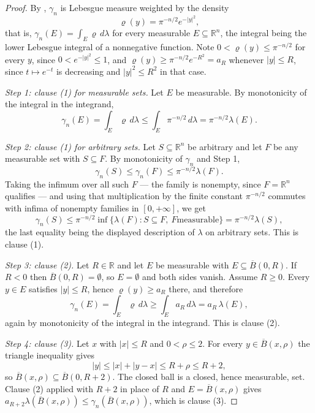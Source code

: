 \begin{proof}
By , $\gamma_n$ is Lebesgue measure weighted by the
density
\[
  \varrho(y) = \pi^{-n/2}e^{-|y|^2} ,
\]
that is, $\gamma_n(E) = \int_E\varrho\,d\lambda$ for every measurable
$E \subseteq \mathbb{R}^n$, the integral being the lower Lebesgue integral of a
nonnegative function.  Note $0 < \varrho(y) \leq \pi^{-n/2}$ for every $y$,
since $0 < e^{-|y|^2} \leq 1$, and $\varrho(y) \geq \pi^{-n/2}e^{-R^2} = a_R$
whenever $|y| \leq R$, since $t \mapsto e^{-t}$ is decreasing and
$|y|^2 \leq R^2$ in that case.

\emph{Step 1: clause (1) for measurable sets.}
Let $E$ be measurable.  By monotonicity of the integral in the integrand,
\[
  \gamma_n(E) = \int_E\varrho\,d\lambda
    \leq \int_E\pi^{-n/2}\,d\lambda
    = \pi^{-n/2}\lambda(E) .
\]

\emph{Step 2: clause (1) for arbitrary sets.}
Let $S \subseteq \mathbb{R}^n$ be arbitrary and let $F$ be any measurable set
with $S \subseteq F$.  By monotonicity of $\gamma_n$ and Step 1,
\[
  \gamma_n(S) \leq \gamma_n(F) \leq \pi^{-n/2}\lambda(F) .
\]
Taking the infimum over all such $F$ --- the family is nonempty, since
$F = \mathbb{R}^n$ qualifies --- and using that multiplication by the finite
constant $\pi^{-n/2}$ commutes with infima of nonempty families in
$[0,+\infty]$, we get
\[
  \gamma_n(S) \leq \pi^{-n/2}\inf\{\lambda(F) : S \subseteq F,\ F \text{
  measurable}\} = \pi^{-n/2}\lambda(S) ,
\]
the last equality being the displayed description of $\lambda$ on arbitrary
sets.  This is clause (1).

\emph{Step 3: clause (2).}
Let $R \in \mathbb{R}$ and let $E$ be measurable with
$E \subseteq \overline B(0,R)$.  If $R < 0$ then $\overline B(0,R) = \emptyset$,
so $E = \emptyset$ and both sides vanish.  Assume $R \geq 0$.  Every $y \in E$
satisfies $|y| \leq R$, hence $\varrho(y) \geq a_R$ there, and therefore
\[
  \gamma_n(E) = \int_E\varrho\,d\lambda
    \geq \int_E a_R\,d\lambda
    = a_R\,\lambda(E) ,
\]
again by monotonicity of the integral in the integrand.  This is clause (2).

\emph{Step 4: clause (3).}
Let $x$ with $|x| \leq R$ and $0 < \rho \leq 2$.  For every
$y \in \overline B(x,\rho)$ the triangle inequality gives
\[
  |y| \leq |x| + |y - x| \leq R + \rho \leq R + 2 ,
\]
so $\overline B(x,\rho) \subseteq \overline B(0,R+2)$.  The closed ball is a
closed, hence measurable, set.  Clause (2) applied with $R+2$ in place of $R$
and $E = \overline B(x,\rho)$ gives
$a_{R+2}\lambda(\overline B(x,\rho)) \leq \gamma_n(\overline B(x,\rho))$,
which is clause (3).


\end{proof}
